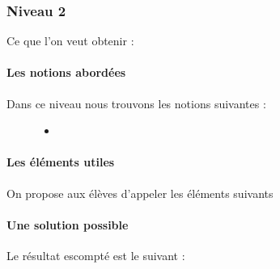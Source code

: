 \documentclass[letterpaper,10pt,french]{sphinxmanual}
\begin{document}
\subsubsection{Niveau 2}
\label{\detokenize{decouverte/de6faces-python2::doc}}\label{\detokenize{decouverte/de6faces-python2:niveau-2}}
Ce que l’on veut obtenir :


\paragraph{Les notions abordées}
\label{\detokenize{decouverte/de6faces-python2:les-notions-abordees}}\begin{description}
\item[{Dans ce niveau nous trouvons les notions suivantes :}] \leavevmode\begin{itemize}
\item {} 
\end{itemize}

\end{description}


\paragraph{Les éléments utiles}
\label{\detokenize{decouverte/de6faces-python2:les-elements-utiles}}
On propose aux élèves d’appeler les éléments suivants


\paragraph{Une solution possible}
\label{\detokenize{decouverte/de6faces-python2:une-solution-possible}}
Le résultat escompté est le suivant :
\end{document}
